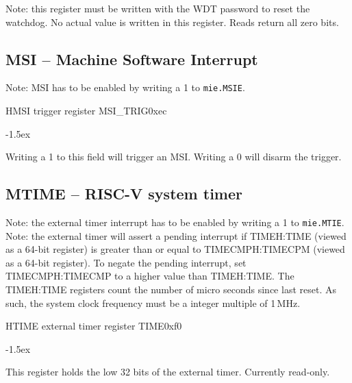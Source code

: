 \documentclass[12pt]{article}
\begin{document}
Note: this register must be written with the WDT password to reset the watchdog. No actual value is written in this register. Reads return all zero bits.



\subsection{MSI -- Machine Software Interrupt}
Note: MSI has to be enabled by writing a 1 to \lstinline[breaklines=false]|mie.MSIE|.

\begin{register}{H}{MSI trigger register MSI\_TRIG}{0xec}
\label{msitrig}
%
%
\regnewline%
\end{register}
\begin{regdesc}[0.8\textwidth]\begin{reglist}[00000]
\itemsep-1.5ex
\item [TRIG] Writing a 1 to this field will trigger an MSI. Writing a 0 will disarm the trigger.
\end{reglist}\end{regdesc}

\subsection{MTIME -- RISC-V system timer}
Note: the external timer interrupt has to be enabled by writing a 1 to \lstinline[breaklines=false]|mie.MTIE|.
Note: the external timer will assert a pending interrupt if TIMEH:TIME (viewed as a 64-bit register) is greater than or equal to TIMECMPH:TIMECPM (viewed as a 64-bit register). To negate the pending interrupt, set TIMECMPH:TIMECMP to a higher value than TIMEH:TIME. The TIMEH:TIME registers count the number of micro seconds since last reset. As such, the system clock frequency must be a integer multiple of 1\,MHz.

\begin{register}{H}{TIME external timer register TIME}{0xf0}
\label{time}
\regnewline%
\end{register}
\begin{regdesc}[0.8\textwidth]\begin{reglist}[00000]
\itemsep-1.5ex
\item [TIME] This register holds the low 32 bits of the external timer. Currently read-only.
\end{reglist}\end{regdesc}
\end{document}

